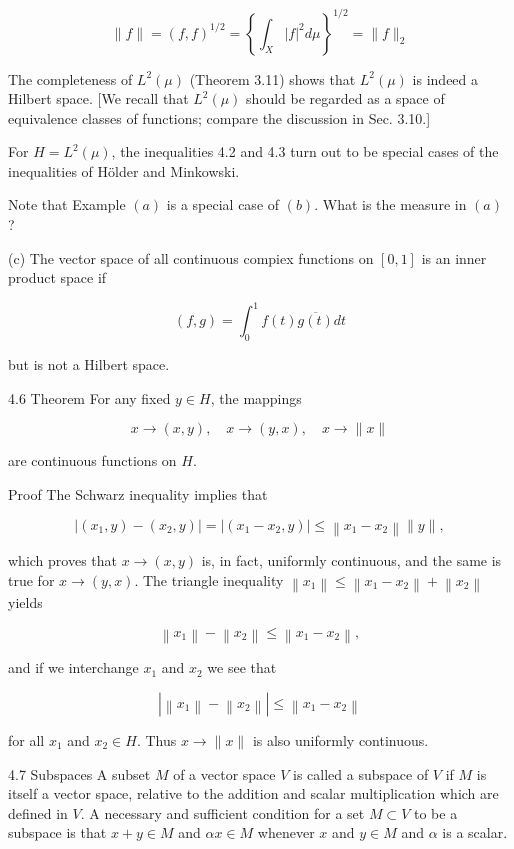 \documentclass[10pt]{article}
\begin{document}
$$
\|f\|=(f, f)^{1 / 2}=\left\{\int_{X}|f|^{2} d \mu\right\}^{1 / 2}=\|f\|_{2}
$$

The completeness of $L^{2}(\mu)$ (Theorem 3.11) shows that $L^{2}(\mu)$ is indeed a Hilbert space. [We recall that $L^{2}(\mu)$ should be regarded as a space of equivalence classes of functions; compare the discussion in Sec. 3.10.]

For $H=L^{2}(\mu)$, the inequalities 4.2 and 4.3 turn out to be special cases of the inequalities of Hölder and Minkowski.

Note that Example $(a)$ is a special case of $(b)$. What is the measure in $(a)$ ?

(c) The vector space of all continuous compiex functions on $[0,1]$ is an inner product space if

$$
(f, g)=\int_{0}^{1} f(t) \overline{g(t)} d t
$$

but is not a Hilbert space.

4.6 Theorem For any fixed $y \in H$, the mappings

$$
x \rightarrow(x, y), \quad x \rightarrow(y, x), \quad x \rightarrow\|x\|
$$

are continuous functions on $H$.

Proof The Schwarz inequality implies that

$$
\left|\left(x_{1}, y\right)-\left(x_{2}, y\right)\right|=\left|\left(x_{1}-x_{2}, y\right)\right| \leq\left\|x_{1}-x_{2}\right\|\|y\|,
$$

which proves that $x \rightarrow(x, y)$ is, in fact, uniformly continuous, and the same is true for $x \rightarrow(y, x)$. The triangle inequality $\left\|x_{1}\right\| \leq\left\|x_{1}-x_{2}\right\|+\left\|x_{2}\right\|$ yields

$$
\left\|x_{1}\right\|-\left\|x_{2}\right\| \leq\left\|x_{1}-x_{2}\right\|,
$$

and if we interchange $x_{1}$ and $x_{2}$ we see that

$$
\left|\left\|x_{1}\right\|-\left\|x_{2}\right\|\right| \leq\left\|x_{1}-x_{2}\right\|
$$

for all $x_{1}$ and $x_{2} \in H$. Thus $x \rightarrow\|x\|$ is also uniformly continuous.

4.7 Subspaces A subset $M$ of a vector space $V$ is called a subspace of $V$ if $M$ is itself a vector space, relative to the addition and scalar multiplication which are defined in $V$. A necessary and sufficient condition for a set $M \subset V$ to be a subspace is that $x+y \in M$ and $\alpha x \in M$ whenever $x$ and $y \in M$ and $\alpha$ is a scalar.
\end{document}
